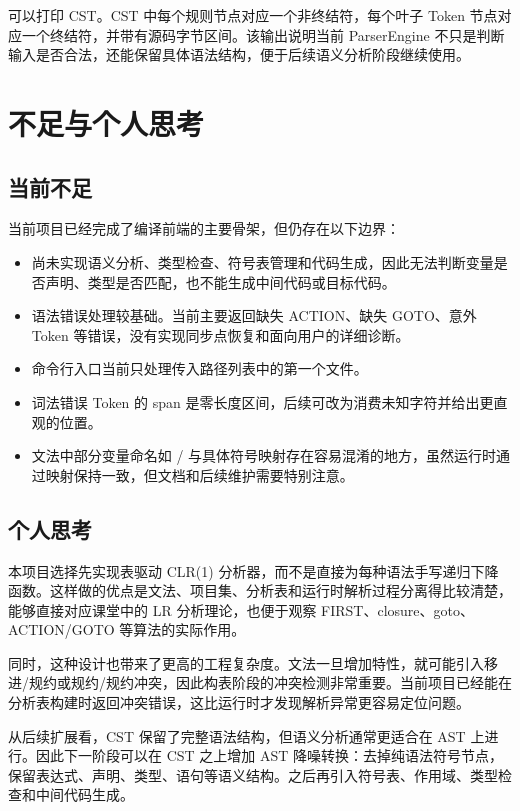 \documentclass[UTF8,a4paper,12pt,fontset=none]{ctexart}
\newcommand{\code}[1]{\texttt{\detokenize{#1}}}
\begin{document}
可以打印 CST。CST 中每个规则节点对应一个非终结符，每个叶子 Token 节点对应一个终结符，并带有源码字节区间。该输出说明当前 ParserEngine 不只是判断输入是否合法，还能保留具体语法结构，便于后续语义分析阶段继续使用。

\section{不足与个人思考}

\subsection{当前不足}

当前项目已经完成了编译前端的主要骨架，但仍存在以下边界：

\begin{itemize}
  \item 尚未实现语义分析、类型检查、符号表管理和代码生成，因此无法判断变量是否声明、类型是否匹配，也不能生成中间代码或目标代码。
  \item 语法错误处理较基础。当前主要返回缺失 ACTION、缺失 GOTO、意外 Token 等错误，没有实现同步点恢复和面向用户的详细诊断。
  \item 命令行入口当前只处理传入路径列表中的第一个文件。
  \item 词法错误 Token 的 span 是零长度区间，后续可改为消费未知字符并给出更直观的位置。
  \item 文法中部分变量命名如 \code{l_brace}/\code{l_bracket} 与具体符号映射存在容易混淆的地方，虽然运行时通过映射保持一致，但文档和后续维护需要特别注意。
\end{itemize}

\subsection{个人思考}

本项目选择先实现表驱动 CLR(1) 分析器，而不是直接为每种语法手写递归下降函数。这样做的优点是文法、项目集、分析表和运行时解析过程分离得比较清楚，能够直接对应课堂中的 LR 分析理论，也便于观察 FIRST、closure、goto、ACTION/GOTO 等算法的实际作用。

同时，这种设计也带来了更高的工程复杂度。文法一旦增加特性，就可能引入移进/规约或规约/规约冲突，因此构表阶段的冲突检测非常重要。当前项目已经能在分析表构建时返回冲突错误，这比运行时才发现解析异常更容易定位问题。

从后续扩展看，CST 保留了完整语法结构，但语义分析通常更适合在 AST 上进行。因此下一阶段可以在 CST 之上增加 AST 降噪转换：去掉纯语法符号节点，保留表达式、声明、类型、语句等语义结构。之后再引入符号表、作用域、类型检查和中间代码生成。
\end{document}
